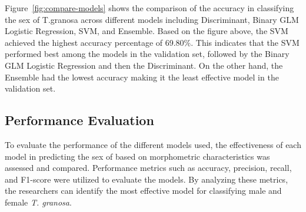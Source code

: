 Figure~\ref{fig:compare-models} shows the comparison of the accuracy in classifying the sex of T.granosa across different models including Discriminant, Binary GLM Logistic Regression, SVM, and Ensemble. Based on the figure above, the SVM achieved the highest accuracy percentage of 69.80\%. This indicates that the SVM performed best among the models in the validation set, followed by the Binary GLM Logistic Regression and then the Discriminant. On the other hand, the Ensemble had the lowest accuracy making it the least effective model in the validation set. 

\subsection{Performance Evaluation}

To evaluate the performance of the different models used, the effectiveness of each model in predicting the sex of \Tgranosa based on morphometric characteristics was assessed and compared. Performance metrics such as accuracy, precision, recall, and F1-score were utilized to evaluate the models. By analyzing these metrics, the researchers can identify the most effective model for classifying male and female \textit{T. granosa}.


\begin{table}[H]
	\centering
	\caption{Performance Metrics of Machine Learning Models for Sex Identification}
	\label{tab:model-performance}
\end{table}

